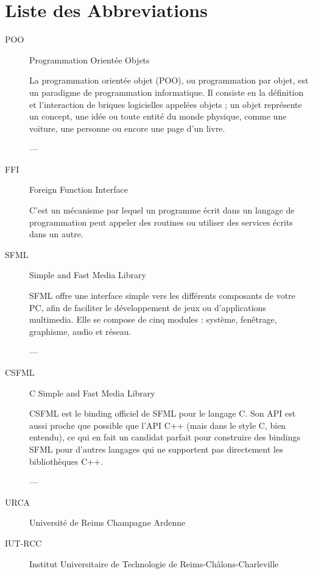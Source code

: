 \documentclass[11pt,a4paper,krantz2,11pt,oneside]{krantz}
\renewenvironment{quote}{\begin{VF}}{\end{VF}}
\begin{document}
\hypertarget{liste-des-abbreviations}{%
\chapter*{Liste des Abbreviations}\label{liste-des-abbreviations}}


\begin{description}
\item[POO]
Programmation Orientée Objets

\begin{quote}
La programmation orientée objet (POO), ou programmation par objet, est un paradigme de programmation informatique. Il consiste en la définition et l'interaction de briques logicielles appelées objets ; un objet représente un concept, une idée ou toute entité du monde physique, comme une voiture, une personne ou encore une page d'un livre.
\end{quote}

--- \citep{wikipedia_programmation_2020}
\item[FFI]
Foreign Function Interface

C'est un mécanisme par lequel un programme écrit dans un langage de programmation peut appeler des routines ou utiliser des services écrits dans un autre.
\item[SFML]
Simple and Fast Media Library

\begin{quote}
SFML offre une interface simple vers les différents composants de votre PC, afin de faciliter le développement de jeux ou d'applications multimedia. Elle se compose de cinq modules : système, fenêtrage, graphisme, audio et réseau.
\end{quote}

--- \citep{laurent_sfml_2020}
\item[CSFML]
C Simple and Fast Media Library

\begin{quote}
CSFML est le binding officiel de SFML pour le langage C. Son API est aussi proche que possible que l'API C++ (mais dans le style C, bien entendu), ce qui en fait un candidat parfait pour construire des bindings SFML pour d'autres langages qui ne supportent pas directement les bibliothèques C++.
\end{quote}

--- \citep{laurent_sfml_2020}
\item[URCA]
Université de Reims Champagne Ardenne
\item[IUT-RCC]
Institut Universitaire de Technologie de Reims-Châlons-Charleville
\end{description}

\backmatter



\printindex
\end{document}
